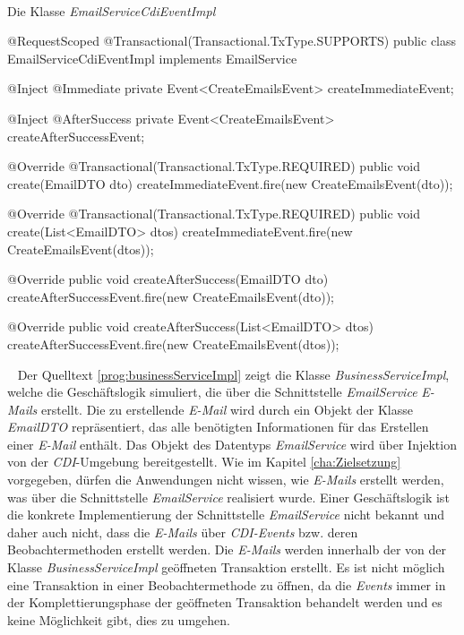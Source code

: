 \ \begin{program}
\caption{Die Klasse \emph{EmailServiceCdiEventImpl}}
\label{prog:emailServiceCdiEventImpl}
\begin{JavaCode}
@RequestScoped
@Transactional(Transactional.TxType.SUPPORTS)
public class EmailServiceCdiEventImpl implements EmailService {

    @Inject
    @Immediate
    private Event<CreateEmailsEvent> createImmediateEvent;
    
    @Inject
    @AfterSuccess
    private Event<CreateEmailsEvent> createAfterSuccessEvent;

    @Override
    @Transactional(Transactional.TxType.REQUIRED)
    public void create(EmailDTO dto) {
        createImmediateEvent.fire(new CreateEmailsEvent(dto));
    }

    @Override
    @Transactional(Transactional.TxType.REQUIRED)
    public void create(List<EmailDTO> dtos) {
        createImmediateEvent.fire(new CreateEmailsEvent(dtos));
    }

    @Override
    public void createAfterSuccess(EmailDTO dto) {
        createAfterSuccessEvent.fire(new CreateEmailsEvent(dto));
    }

    @Override
    public void createAfterSuccess(List<EmailDTO> dtos) {
        createAfterSuccessEvent.fire(new CreateEmailsEvent(dtos));
    }
    
}
\end{JavaCode}
\end{program}
\ \newline
Der Quelltext \ref{prog:businessServiceImpl} zeigt die Klasse \emph{BusinessServiceImpl}, welche die Geschäftslogik simuliert, die über die Schnittstelle \emph{EmailService} \emph{E-Mails} erstellt. Die zu erstellende \emph{E-Mail} wird durch ein Objekt der Klasse \emph{EmailDTO} repräsentiert, das alle benötigten Informationen für das Erstellen einer \emph{E-Mail} enthält. Das Objekt des Datentyps \emph{EmailService} wird über Injektion von der \emph{CDI}-Umgebung bereitgestellt. Wie im Kapitel \ref{cha:Zielsetzung} vorgegeben, dürfen die Anwendungen nicht wissen, wie \emph{E-Mails} erstellt werden, was über die Schnittstelle \emph{EmailService} realisiert wurde. Einer Geschäftslogik ist die konkrete Implementierung der Schnittstelle \emph{EmailService} nicht bekannt und daher auch nicht, dass die \emph{E-Mails} über \emph{CDI-Events} bzw. deren Beobachtermethoden erstellt werden.
\newline
\newline
Die \emph{E-Mails} werden innerhalb der von der Klasse \emph{BusinessServiceImpl} geöffneten Transaktion erstellt. Es ist nicht möglich eine Transaktion in einer Beobachtermethode zu öffnen, da die \emph{Events} immer in der Komplettierungsphase der geöffneten Transaktion behandelt werden und es keine Möglichkeit gibt, dies zu umgehen.
